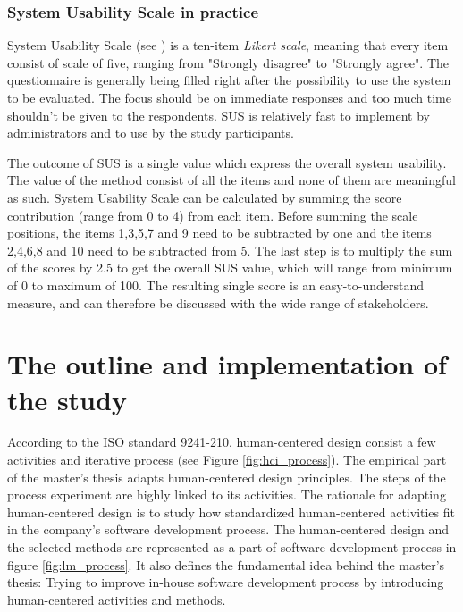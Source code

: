 \documentclass[12pt,a4paper,oneside,pdftex]{report}
\begin{document}
\subsection{System Usability Scale in practice}
System Usability Scale (see ) is a ten-item \emph{Likert scale}, meaning that every item consist of scale of five, ranging from "Strongly disagree" to "Strongly agree". The questionnaire is generally being filled right after the possibility to use the system to be evaluated. The focus should be on immediate responses and too much time shouldn't be given to the respondents. SUS is relatively fast to implement by administrators and to use by the study participants. \cite{RefWorks:10} 

The outcome of SUS is a single value which express the overall system usability. The value of the method consist of all the items and none of them are meaningful as such. System Usability Scale can be calculated by summing the score contribution (range from 0 to 4) 		from each item. Before summing the scale positions, the items 1,3,5,7 and 9 need to be subtracted by one and the items 2,4,6,8 and 10 need to be subtracted from 5. The last step is to multiply the sum of the scores by 2.5 to get the overall SUS value, which will range from minimum of 0 to maximum of 100. \cite{RefWorks:10} The resulting single score is an easy-to-understand measure, and can therefore be discussed with the wide range of stakeholders. \cite{RefWorks:12} 
    
\chapter{The outline and implementation of the study}
\label{chapter:implementation}

According to the ISO standard 9241-210, human-centered design consist a few activities and iterative process (see Figure \ref{fig:hci_process}). \cite{RefWorks:16} The empirical part of the master's thesis adapts human-centered design principles. The steps of the process experiment are highly linked to its activities. The rationale for adapting human-centered design is to study how standardized human-centered activities fit in the company's software development process. The human-centered design and the selected methods are represented as a part of software development process in figure \ref{fig:lm_process}. It also defines the fundamental idea behind the master's thesis: Trying to improve in-house software development process by introducing human-centered activities and methods.
\end{document}
